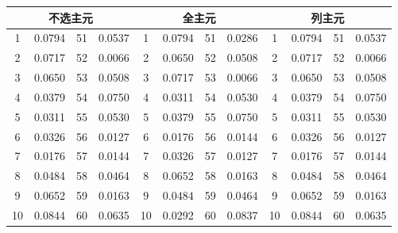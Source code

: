 \documentclass{article}
\begin{document}
\begin{longtable}[c]{cccccccccccc}
	\toprule
	\multicolumn{4}{c}{\textbf{不选主元}}                            & \multicolumn{4}{c}{\textbf{全主元}}                                      & \multicolumn{4}{c}{\textbf{列主元}}                                      \\
	\endfirsthead
	\endhead
	\midrule
	1         & 0.0794       & 51            & 0.0537            & 1        & 0.0794        & 51            & 0.0286            & 1        & 0.0794        & 51            & 0.0537            \\
	2         & 0.0717       & 52            & 0.0066            & 2        & 0.0650        & 52            & 0.0508            & 2        & 0.0717        & 52            & 0.0066            \\
	3         & 0.0650       & 53            & 0.0508            & 3        & 0.0717        & 53            & 0.0066            & 3        & 0.0650        & 53            & 0.0508            \\
	4         & 0.0379       & 54            & 0.0750            & 4        & 0.0311        & 54            & 0.0530            & 4        & 0.0379        & 54            & 0.0750            \\
	5         & 0.0311       & 55            & 0.0530            & 5        & 0.0379        & 55            & 0.0750            & 5        & 0.0311        & 55            & 0.0530            \\
	6         & 0.0326       & 56            & 0.0127            & 6        & 0.0176        & 56            & 0.0144            & 6        & 0.0326        & 56            & 0.0127            \\
	7         & 0.0176       & 57            & 0.0144            & 7        & 0.0326        & 57            & 0.0127            & 7        & 0.0176        & 57            & 0.0144            \\
	8         & 0.0484       & 58            & 0.0464            & 8        & 0.0652        & 58            & 0.0163            & 8        & 0.0484        & 58            & 0.0464            \\
	9         & 0.0652       & 59            & 0.0163            & 9        & 0.0484        & 59            & 0.0464            & 9        & 0.0652        & 59            & 0.0163            \\
	10        & 0.0844       & 60            & 0.0635            & 10       & 0.0292        & 60            & 0.0837            & 10       & 0.0844        & 60            & 0.0635            \\

\end{longtable}
\end{document}
